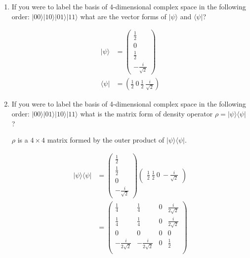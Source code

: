 \documentclass[10pt]{article}
\newcommand{\ket}[1]{\vert #1 \rangle}
\newcommand{\bra}[1]{\langle #1 \vert}
\begin{document}
\begin{enumerate}
\begin{enumerate}
          For $\bra{\psi}$, this can be represented as the complex conjugate of the column vector rewritten as a row vector:

          \begin{equation*}
            \bra{\psi} = ( \frac12 \ \frac12 \ 0 \ \frac{i}{\sqrt2})
          \end{equation*}

        \item{If you were to label the basis of 4-dimensional complex space in the following order: $\ket{00} \ket{10} \ket{01} \ket{11}$ what are the vector forms of $\ket{\psi}$ and $\bra{\psi}$?}

          \begin{align*}
            \ket{\psi} &= \begin{pmatrix} \frac12 \\ 0 \\ \frac12 \\ -\frac{i}{\sqrt2} \end{pmatrix} \\
              \bra{\psi} &= ( \frac12 \ 0 \ \frac12 \ \frac{i}{\sqrt2})
          \end{align*}

        \item{If you were to label the basis of 4-dimensional complex space in the following order: $\ket{00} \ket{01} \ket{10} \ket{11}$ what is the matrix form of density operator $\rho = \ket{\psi} \bra{\psi}$?}

          $\rho$ is a $4 \times 4$ matrix formed by the outer product of $\ket{\psi}\bra{\psi}$.

          \begin{align*}
            \ket{\psi}\bra{\psi} &= \begin{pmatrix} \frac12 \\ \frac12 \\ 0 \\ -\frac{i}{\sqrt2} \end{pmatrix} \begin{pmatrix} \frac12 \ \frac12 \ 0 \ -\frac{i}{\sqrt2} \end{pmatrix} \\
                                 &= \begin{pmatrix}
                                   \frac14 & \frac14 & 0 & \frac{i}{2\sqrt2} \\
                                   \frac14 & \frac14 & 0 & \frac{i}{2\sqrt2} \\
                                   0 & 0 & 0 & 0 \\
                                   -\frac{i}{2\sqrt2} & -\frac{i}{2\sqrt2} & 0 & \frac12 \\
                                 \end{pmatrix}
         \end{align*}


\end{enumerate}
\end{enumerate}
\end{document}
